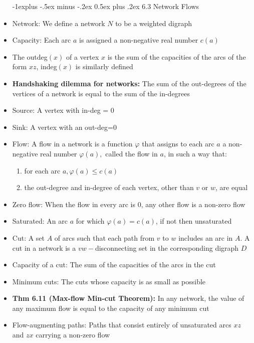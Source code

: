 \documentclass[10pt,landscape]{article}
\makeatletter
\renewcommand{\subsection}{\@startsection{subsection}{2}{0mm}%
                                {-1explus -.5ex minus -.2ex}%
                                {0.5ex plus .2ex}%
                                {\normalfont\normalsize\bfseries}}
\makeatother
\begin{document}
\begin{multicols}{2}
\begin{itemize}
    \subsection{6.3 Network Flows}
    \item Network: We define a network $N$ to be a weighted digraph
    \item Capacity: Each arc $a$ is assigned a non-negative real number $c(a)$
    \item The outdeg$(x)$ of a vertex $x$ is the sum of the capacities of the arcs of the form $xz$, indeg$(x)$ is similarly defined
    \item \textbf{Handshaking dilemma for networks:} The sum of the out-degrees of the vertices of a network is equal to the sum of the in-degrees
    \item Source: A vertex with in-deg = 0
    \item Sink: A vertex with an out-deg=0
    \item Flow: A flow in a network is a function $\varphi$ that assigns to each arc $a$ a non-negative real number $\varphi(a),$ called the flow in $a$, in such a way that:\begin{enumerate}
        \item for each arc $a, \varphi(a)\le c(a)$
        \item the out-degree and in-degree of each vertex, other than $v$ or $w$, are equal
    \end{enumerate}
    \item Zero flow: When the flow in every arc is 0, any other flow is a non-zero flow
    \item Saturated: An arc $a$ for which $\varphi(a)=c(a)$, if not then unsaturated
    \item Cut: A set $A$ of arcs such that each path from $v$ to $w$ includes an arc in $A$. A cut in a network is a $vw-$disconnecting set in the corresponding digraph $D$
    \item Capacity of a cut: The sum of the capacities of the arcs in the cut
    \item Minimum cuts: The cuts whose capacity is as small as possible
    \item \textbf{Thm 6.11 (Max-flow Min-cut Theorem):} In any network, the value of any maximum flow is equal to the capacity of any minimum cut
    \item Flow-augmenting paths: Paths that consist entirely of unsaturated arcs $xz$ and $zx$ carrying a non-zero flow
    
\end{itemize}
    


\end{multicols}
\end{document}

